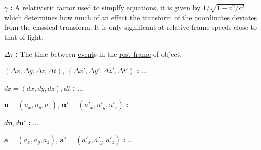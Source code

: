 \linesep

\noindent ${\gamma}$ \textbf{:}
A relativistic factor used to simplfy equations, it is given by ${1/\sqrt{1-v^2/c^2}}$ which determines how much of an effect the \hyperlink{def-transform}{transform} of the coordinates deviates from the classical transform. It is only significant at relative frame speeds close to that of light.

\linesep

\noindent ${\Delta \tau}$ \textbf{:}
The time between \hyperlink{def-event}{event}s in the \hyperlink{def-proper-frame}{rest frame} of object.

\linesep

\noindent $({\Delta x},{\Delta y},{\Delta z},{\Delta t})$, $({\Delta x{'}},{\Delta y{'}},{\Delta z{'}},{\Delta t{'}})$ \textbf{:}
...

\linesep

\noindent ${d\mathbf{r}} = ({dx},{dy},{dz}) , {dt}$ \textbf{:}
...

\linesep

\noindent ${\mathbf{u}}=({u_x},{u_y},{u_z})$, ${\mathbf{u}'}=({u'_x},{u'_y},{u'_z})$  \textbf{:}
...

\linesep

\noindent ${d\mathbf{u}},{d\mathbf{u}{'}}$ \textbf{:}
...

\linesep

\noindent ${\mathbf{a}}=({a_x},{a_y},{a_z})$, ${\mathbf{a}'}=({a'_x},{a'_y},{a'_z})$  \textbf{:}
...
